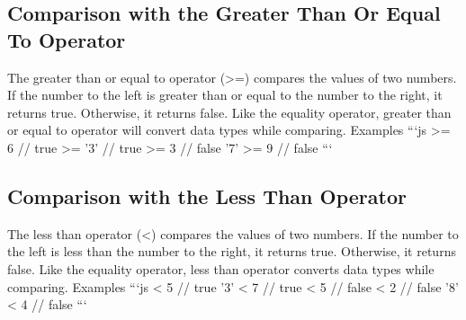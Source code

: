 \documentclass{article}%
\begin{document}
%
\subsection{Comparison with the Greater Than Or Equal To Operator}%
\label{subsec:ComparisonwiththeGreaterThanOrEqualToOperator}%
The greater than or equal to operator (>=) compares the values of two numbers. If the number to the left is greater than or equal to the number to the right, it returns true. Otherwise, it returns false.\newline%
Like the equality operator, greater than or equal to operator will convert data types while comparing.\newline%
Examples\newline%
```js   >=  6   // true   >= '3'  // true   >=  3   // false\newline%
'7' >=  9   // false\newline%
```\newline%

%
\subsection{Comparison with the Less Than Operator}%
\label{subsec:ComparisonwiththeLessThanOperator}%
The less than operator (<) compares the values of two numbers. If the number to the left is less than the number to the right, it returns true. Otherwise, it returns false. Like the equality operator, less than operator converts data types while comparing.\newline%
Examples\newline%
```js   < 5  // true\newline%
'3' < 7  // true   < 5  // false   < 2  // false\newline%
'8' < 4  // false\newline%
```\newline%

%
\end{document}
